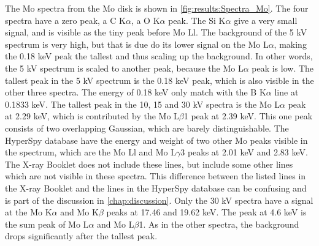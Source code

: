 The Mo spectra from the Mo disk is shown in \cref{fig:results:Spectra_Mo}.
The four spectra have a zero peak, a C K$\alpha$, a O K$\alpha$ peak.
The Si K$\alpha$ give a very small signal, and is visible as the tiny peak before Mo Ll.
The background of the 5 kV spectrum is very high, but that is due do its lower signal on the Mo L$\alpha$, making the 0.18 keV peak the tallest and thus scaling up the background.
In other words, the 5 kV spectrum is scaled to another peak, because the Mo L$\alpha$ peak is low. %
The tallest peak in the 5 kV spectrum is the 0.18 keV peak, which is also visible in the other three spectra.
The energy of 0.18 keV only match with the B K$\alpha$ line at 0.1833 keV. %
The tallest peak in the 10, 15 and 30 kV spectra is the Mo L$\alpha$ peak at 2.29 keV, which is contributed by the Mo L$\beta$1 peak at 2.39 keV.
This one peak consists of two overlapping Gaussian, which are barely distinguishable.
The HyperSpy database have the energy and weight of two other Mo peaks visible in the spectrum, which are the Mo Ll and Mo L$\gamma$3 peaks at 2.01 keV and 2.83 keV.
%
%
The X-ray Booklet does not include these lines, but include some other lines which are not visible in these spectra.
This difference between the listed lines in the X-ray Booklet and the lines in the HyperSpy database can be confusing and is part of the discussion in \cref{chap:discussion}. %
Only the 30 kV spectra have a signal at the Mo K$\alpha$ and Mo K$\beta$ peaks at 17.46 and 19.62 keV. %
The peak at 4.6 keV is the sum peak of Mo L$\alpha$ and Mo L$\beta$1.
As in the other spectra, the background drops significantly after the tallest peak.


